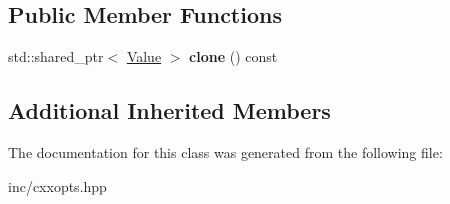 \subsection*{Public Member Functions}
\begin{DoxyCompactItemize}
\item 
std\+::shared\+\_\+ptr$<$ \hyperlink{classcxxopts_1_1Value}{Value} $>$ {\bfseries clone} () const \hypertarget{classcxxopts_1_1values_1_1standard__value_a2fff8d2748d7b4252198b2259bac182d}{}\label{classcxxopts_1_1values_1_1standard__value_a2fff8d2748d7b4252198b2259bac182d}

\end{DoxyCompactItemize}
\subsection*{Additional Inherited Members}


The documentation for this class was generated from the following file\+:\begin{DoxyCompactItemize}
\item 
inc/cxxopts.\+hpp\end{DoxyCompactItemize}
